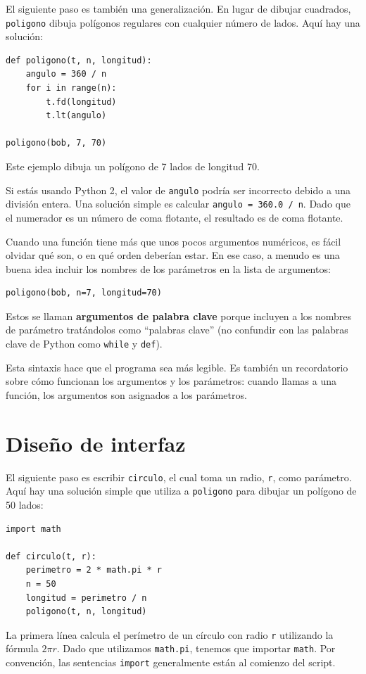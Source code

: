 \documentclass[10pt]{book}
\begin{document}
El siguiente paso es también una generalización.  En lugar de dibujar
cuadrados, {\tt poligono} dibuja polígonos regulares con cualquier número de
lados.  Aquí hay una solución:

\begin{verbatim}
def poligono(t, n, longitud):
    angulo = 360 / n
    for i in range(n):
        t.fd(longitud)
        t.lt(angulo)

poligono(bob, 7, 70)
\end{verbatim}
%
Este ejemplo dibuja un polígono de 7 lados de longitud 70.

Si estás usando Python 2, el valor de {\tt angulo} podría ser incorrecto
debido a una división entera.  Una solución simple es calcular
{\tt angulo = 360.0 / n}.  Dado que el numerador es un número de
coma flotante, el resultado es de coma flotante.

Cuando una función tiene más que unos pocos argumentos numéricos, es fácil
olvidar qué son, o en qué orden deberían estar.  En ese caso,
a menudo es una buena idea incluir los nombres de los parámetros en la
lista de argumentos:

\begin{verbatim}
poligono(bob, n=7, longitud=70)
\end{verbatim}
%
Estos se llaman {\bf argumentos de palabra clave} porque incluyen
a los nombres de parámetro tratándolos como ``palabras clave'' (no confundir con
las palabras clave de Python como {\tt while} y {\tt def}).

Esta sintaxis hace que el programa sea más legible.  Es también un recordatorio
sobre cómo funcionan los argumentos y los parámetros: cuando llamas a una función, los
argumentos son asignados a los parámetros.


\section{Diseño de interfaz}

El siguiente paso es escribir {\tt circulo}, el cual toma un radio,
{\tt r}, como parámetro.  Aquí hay una solución simple que utiliza a
{\tt poligono} para dibujar un polígono de 50 lados:

\begin{verbatim}
import math

def circulo(t, r):
    perimetro = 2 * math.pi * r
    n = 50
    longitud = perimetro / n
    poligono(t, n, longitud)
\end{verbatim}
%
La primera línea calcula el perímetro de un círculo con radio
{\tt r} utilizando la fórmula $2 \pi r$.  Dado que utilizamos {\tt math.pi},
tenemos que importar {\tt math}.  Por convención, las sentencias {\tt import}
generalmente están al comienzo del script.
\end{document}
